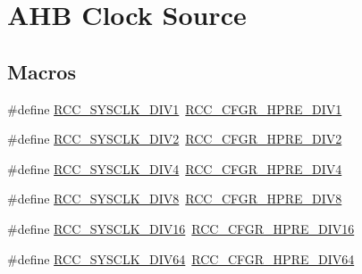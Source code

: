\hypertarget{group___r_c_c___a_h_b___clock___source}{}\section{A\+HB Clock Source}
\label{group___r_c_c___a_h_b___clock___source}
\subsection*{Macros}
\begin{DoxyCompactItemize}
\item 
\#define \hyperlink{group___r_c_c___a_h_b___clock___source_ga226f5bf675015ea677868132b6b83494}{R\+C\+C\+\_\+\+S\+Y\+S\+C\+L\+K\+\_\+\+D\+I\+V1}~\hyperlink{group___peripheral___registers___bits___definition_ga2b7d7f29b09a49c31404fc0d44645c84}{R\+C\+C\+\_\+\+C\+F\+G\+R\+\_\+\+H\+P\+R\+E\+\_\+\+D\+I\+V1}
\item 
\#define \hyperlink{group___r_c_c___a_h_b___clock___source_gac37c0610458a92e3cb32ec81014625c3}{R\+C\+C\+\_\+\+S\+Y\+S\+C\+L\+K\+\_\+\+D\+I\+V2}~\hyperlink{group___peripheral___registers___bits___definition_gaa9eeb5e38e53e79b08a4ac438497ebea}{R\+C\+C\+\_\+\+C\+F\+G\+R\+\_\+\+H\+P\+R\+E\+\_\+\+D\+I\+V2}
\item 
\#define \hyperlink{group___r_c_c___a_h_b___clock___source_ga6fd3652d6853563cdf388a4386b9d22f}{R\+C\+C\+\_\+\+S\+Y\+S\+C\+L\+K\+\_\+\+D\+I\+V4}~\hyperlink{group___peripheral___registers___bits___definition_gaffe860867ae4b1b6d28473ded1546d91}{R\+C\+C\+\_\+\+C\+F\+G\+R\+\_\+\+H\+P\+R\+E\+\_\+\+D\+I\+V4}
\item 
\#define \hyperlink{group___r_c_c___a_h_b___clock___source_ga7def31373854ba9c72bb76b1d13e3aad}{R\+C\+C\+\_\+\+S\+Y\+S\+C\+L\+K\+\_\+\+D\+I\+V8}~\hyperlink{group___peripheral___registers___bits___definition_gaca71d6b42bdb83b5ff5320578869a058}{R\+C\+C\+\_\+\+C\+F\+G\+R\+\_\+\+H\+P\+R\+E\+\_\+\+D\+I\+V8}
\item 
\#define \hyperlink{group___r_c_c___a_h_b___clock___source_ga895462b261e03eade3d0139cc1327a51}{R\+C\+C\+\_\+\+S\+Y\+S\+C\+L\+K\+\_\+\+D\+I\+V16}~\hyperlink{group___peripheral___registers___bits___definition_ga3806da4f1afc9e5be0fca001c8c57815}{R\+C\+C\+\_\+\+C\+F\+G\+R\+\_\+\+H\+P\+R\+E\+\_\+\+D\+I\+V16}
\item 
\#define \hyperlink{group___r_c_c___a_h_b___clock___source_ga73814b5a7ee000687ec8334637ca5b14}{R\+C\+C\+\_\+\+S\+Y\+S\+C\+L\+K\+\_\+\+D\+I\+V64}~\hyperlink{group___peripheral___registers___bits___definition_ga1caeba8dc2b4c0bb11be600e983e3370}{R\+C\+C\+\_\+\+C\+F\+G\+R\+\_\+\+H\+P\+R\+E\+\_\+\+D\+I\+V64}

\end{DoxyCompactItemize}
